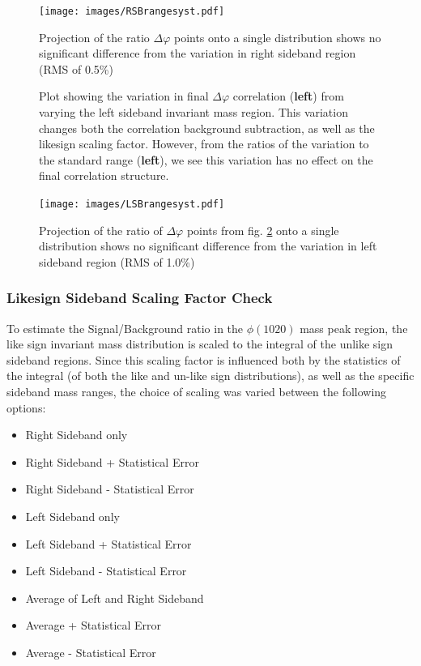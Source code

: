 \documentclass[ALICE,manyauthors]{ALICE_analysis_notes}
\begin{document}
\begin{figure}[ht]
\centering
\texttt{[image: images/RSBrangesyst.pdf]}
\caption{Projection of the ratio $\Delta\varphi$ points onto a single distribution shows no significant difference from the variation in right sideband region (RMS of 0.5\%)}
\label{RSBRMS}
\end{figure}

\begin{figure}[ht]
\centering
\begin{subfigure}{
\texttt{[image: images/LSBrangedphi.pdf]}}
\end{subfigure}
\begin{subfigure}{
\texttt{[image: images/LSBrangeratio.pdf]}}
\end{subfigure}
\caption{Plot showing the variation in final $\Delta\varphi$ correlation (\textbf{left}) from varying the left sideband invariant mass region.  This variation changes both the correlation background subtraction, as well as the likesign scaling factor. However, from the ratios of the variation to the standard range (\textbf{left}), we see this variation has no effect on the final correlation structure.}
\label{LSBcheck}
\end{figure}

\begin{figure}[ht]
\centering
\texttt{[image: images/LSBrangesyst.pdf]}
\caption{Projection of the ratio of $\Delta\varphi$ points from fig. \ref{LSBcheck} onto a single distribution shows no significant difference from the variation in left sideband region (RMS of 1.0\%)}
\label{LSBRMS}
\end{figure}

\subsubsection{Likesign Sideband Scaling Factor Check}

To estimate the Signal/Background ratio in the $\phi(1020)$ mass peak region, the like sign invariant mass distribution is scaled to the integral of the unlike sign sideband regions. Since this scaling factor is influenced both by the statistics of the integral (of both the like and un-like sign distributions), as well as the specific sideband mass ranges, the choice of scaling was varied between the following options:

\begin{itemize}
    \item Right Sideband only
    \item Right Sideband + Statistical Error
    \item Right Sideband - Statistical Error
    \item Left Sideband only
    \item Left Sideband + Statistical Error
    \item Left Sideband - Statistical Error
    \item Average of Left and Right Sideband
    \item Average + Statistical Error
    \item Average - Statistical Error
\end{itemize}
\end{document}
